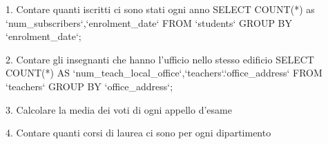 1. Contare quanti iscritti ci sono stati ogni anno
SELECT COUNT(*) as `num_subscribers`,`enrolment_date` FROM `students` GROUP BY `enrolment_date`;

2. Contare gli insegnanti che hanno l'ufficio nello stesso edificio
SELECT COUNT(*) AS `num_teach_local_office`,`teachers`.`office_address` FROM `teachers` GROUP BY `office_address`;

3. Calcolare la media dei voti di ogni appello d'esame


4. Contare quanti corsi di laurea ci sono per ogni dipartimento